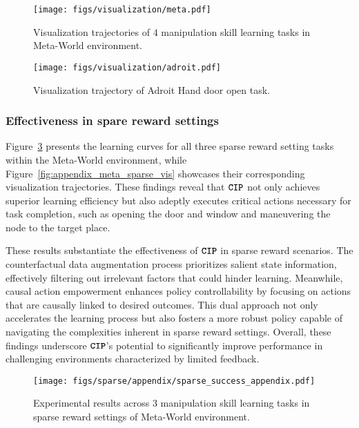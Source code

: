 \begin{figure}[t]
    \centering
    \texttt{[image: figs/visualization/meta.pdf]}
    \caption{Visualization trajectories of $4$ manipulation skill learning tasks in Meta-World environment.}
    \label{fig:appendix_meta_vis}
\end{figure}


\begin{figure}[t]
    \centering
    \texttt{[image: figs/visualization/adroit.pdf]}
    \caption{Visualization trajectory of Adroit Hand door open task.}
    \label{fig:appendix_adroit_vis}
\end{figure}

\subsubsection{Effectiveness in spare reward settings}

Figure~\ref{fig:appendix_meta_sparse} presents the learning curves for all three sparse reward setting tasks within the Meta-World environment, while Figure~\ref{fig:appendix_meta_sparse_vis} showcases their corresponding visualization trajectories. These findings reveal that \(\texttt{\textbf{CIP}}\) not only achieves superior learning efficiency but also adeptly executes critical actions necessary for task completion, such as opening the door and window and maneuvering the node to the target place.

These results substantiate the effectiveness of \(\texttt{\textbf{CIP}}\) in sparse reward scenarios. The counterfactual data augmentation process prioritizes salient state information, effectively filtering out irrelevant factors that could hinder learning. Meanwhile, causal action empowerment enhances policy controllability by focusing on actions that are causally linked to desired outcomes. This dual approach not only accelerates the learning process but also fosters a more robust policy capable of navigating the complexities inherent in sparse reward settings. Overall, these findings underscore \(\texttt{\textbf{CIP}}\)'s potential to significantly improve performance in challenging environments characterized by limited feedback.



\begin{figure}[t]
    \centering
    \texttt{[image: figs/sparse/appendix/sparse\_success\_appendix.pdf]}
    \caption{Experimental results across $3$ manipulation skill learning tasks in sparse reward settings of Meta-World environment.}
    \label{fig:appendix_meta_sparse}
\end{figure}

